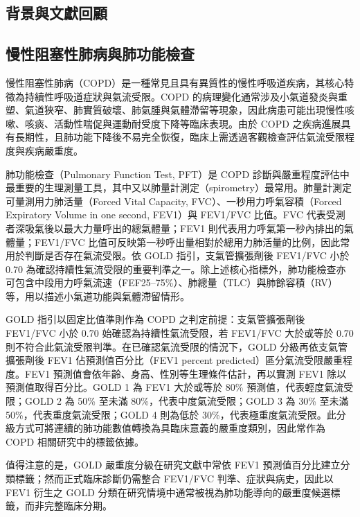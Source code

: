 \begin{ZhChapter}

\chapter{背景與文獻回顧}

\section{慢性阻塞性肺病與肺功能檢查}

慢性阻塞性肺病（COPD）是一種常見且具有異質性的慢性呼吸道疾病，其核心特徵為持續性呼吸道症狀與氣流受限。COPD 的病理變化通常涉及小氣道發炎與重塑、氣道狹窄、肺實質破壞、肺氣腫與氣體滯留等現象，因此病患可能出現慢性咳嗽、咳痰、活動性喘促與運動耐受度下降等臨床表現。由於 COPD 之疾病進展具有長期性，且肺功能下降後不易完全恢復，臨床上需透過客觀檢查評估氣流受限程度與疾病嚴重度\cite{gold2025}。

肺功能檢查（Pulmonary Function Test, PFT）是 COPD 診斷與嚴重程度評估中最重要的生理測量工具，其中又以肺量計測定（spirometry）最常用。肺量計測定可量測用力肺活量（Forced Vital Capacity, FVC）、一秒用力呼氣容積（Forced Expiratory Volume in one second, FEV1）與 FEV1/FVC 比值。FVC 代表受測者深吸氣後以最大力量呼出的總氣體量；FEV1 則代表用力呼氣第一秒內排出的氣體量；FEV1/FVC 比值可反映第一秒呼出量相對於總用力肺活量的比例，因此常用於判斷是否存在氣流受限。依 GOLD 指引，支氣管擴張劑後 FEV1/FVC 小於 0.70 為確認持續性氣流受限的重要判準之一。除上述核心指標外，肺功能檢查亦可包含中段用力呼氣流速（FEF25--75\%）、肺總量（TLC）與肺餘容積（RV）等，用以描述小氣道功能與氣體滯留情形\cite{gold2025}。

GOLD 指引以固定比值準則作為 COPD 之判定前提：支氣管擴張劑後 FEV1/FVC 小於 0.70 始確認為持續性氣流受限，若 FEV1/FVC 大於或等於 0.70 則不符合此氣流受限判準。在已確認氣流受限的情況下，GOLD 分級再依支氣管擴張劑後 FEV1 佔預測值百分比（FEV1 percent predicted）區分氣流受限嚴重程度。FEV1 預測值會依年齡、身高、性別等生理條件估計，再以實測 FEV1 除以預測值取得百分比。GOLD 1 為 FEV1 大於或等於 80\% 預測值，代表輕度氣流受限；GOLD 2 為 50\% 至未滿 80\%，代表中度氣流受限；GOLD 3 為 30\% 至未滿 50\%，代表重度氣流受限；GOLD 4 則為低於 30\%，代表極重度氣流受限\cite{gold2025}。此分級方式可將連續的肺功能數值轉換為具臨床意義的嚴重度類別，因此常作為 COPD 相關研究中的標籤依據。

值得注意的是，GOLD 嚴重度分級在研究文獻中常依 FEV1 預測值百分比建立分類標籤；然而正式臨床診斷仍需整合 FEV1/FVC 判準、症狀與病史，因此以 FEV1 衍生之 GOLD 分類在研究情境中通常被視為肺功能導向的嚴重度候選標籤，而非完整臨床分期。


\end{ZhChapter}
